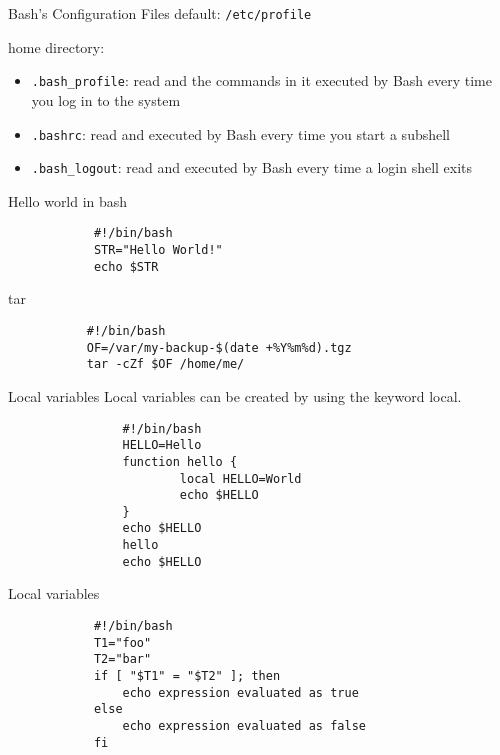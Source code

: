 \begin{frame}[containsverbatim]{Bash's Configuration Files}
default: \verb+/etc/profile+

home directory:
\begin{itemize}
\item  \verb+.bash_profile+: read and the commands in it executed by Bash every time you log in to the system 
\item  \verb+.bashrc+: read and executed by Bash every time you start a subshell 
\item  \verb+.bash_logout+: read and executed by Bash every time a login shell exits 
\end{itemize}
\end{frame}

\begin{frame}[containsverbatim]{Hello world in bash}
\lstset{language=ksh}
\begin{lstlisting}
            #!/bin/bash          
            STR="Hello World!"
            echo $STR    
\end{lstlisting}
\end{frame}



\begin{frame}[containsverbatim]{tar}
\lstset{language=ksh}
\begin{lstlisting}
           #!/bin/bash          
           OF=/var/my-backup-$(date +%Y%m%d).tgz
           tar -cZf $OF /home/me/
\end{lstlisting}
\end{frame}

\begin{frame}[containsverbatim]{Local variables }
Local variables can be created by using the keyword local. 
\lstset{language=ksh}
\begin{lstlisting}
                #!/bin/bash
                HELLO=Hello 
                function hello {
                        local HELLO=World
                        echo $HELLO
                }
                echo $HELLO
                hello
                echo $HELLO
\end{lstlisting}
\end{frame}

\begin{frame}[containsverbatim]{Local variables }
\begin{lstlisting}
            #!/bin/bash
            T1="foo"
            T2="bar"
            if [ "$T1" = "$T2" ]; then
                echo expression evaluated as true
            else
                echo expression evaluated as false
            fi
\end{lstlisting}
\end{frame}


